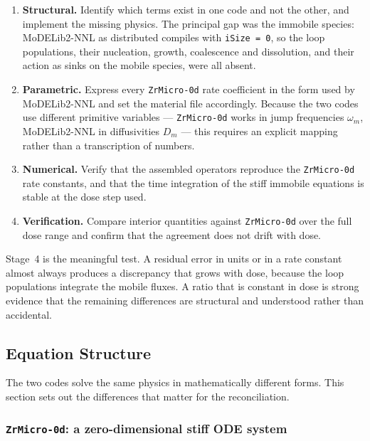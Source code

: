 \documentclass{article}
\newcommand{\MoD}{\textsf{MoDELib2-NNL}}
\newcommand{\ZrOd}{\texttt{ZrMicro-0d}}
\begin{document}
\begin{enumerate}
\item \textbf{Structural.} Identify which terms exist in one code and not the
other, and implement the missing physics. The principal gap was the immobile
species: \MoD{} as distributed compiles with \texttt{iSize = 0}, so the loop
populations, their nucleation, growth, coalescence and dissolution, and their
action as sinks on the mobile species, were all absent.

\item \textbf{Parametric.} Express every \ZrOd{} rate coefficient in the form used
by \MoD{} and set the material file accordingly. Because the two codes use
different primitive variables --- \ZrOd{} works in jump frequencies $\omega_m$,
\MoD{} in diffusivities $D_m$ --- this requires an explicit mapping rather than a
transcription of numbers.

\item \textbf{Numerical.} Verify that the assembled operators reproduce the
\ZrOd{} rate constants, and that the time integration of the stiff immobile
equations is stable at the dose step used.

\item \textbf{Verification.} Compare interior quantities against \ZrOd{} over the
full dose range and confirm that the agreement does not drift with dose.
\end{enumerate}

Stage~4 is the meaningful test. A residual error in units or in a rate constant
almost always produces a discrepancy that grows with dose, because the loop
populations integrate the mobile fluxes. A ratio that is constant in dose is
strong evidence that the remaining differences are structural and understood
rather than accidental.

\subsection{Equation Structure}
\label{sec:structure}

The two codes solve the same physics in mathematically different forms. This
section sets out the differences that matter for the reconciliation.

\subsubsection{\ZrOd{}: a zero-dimensional stiff ODE system}
\end{document}
